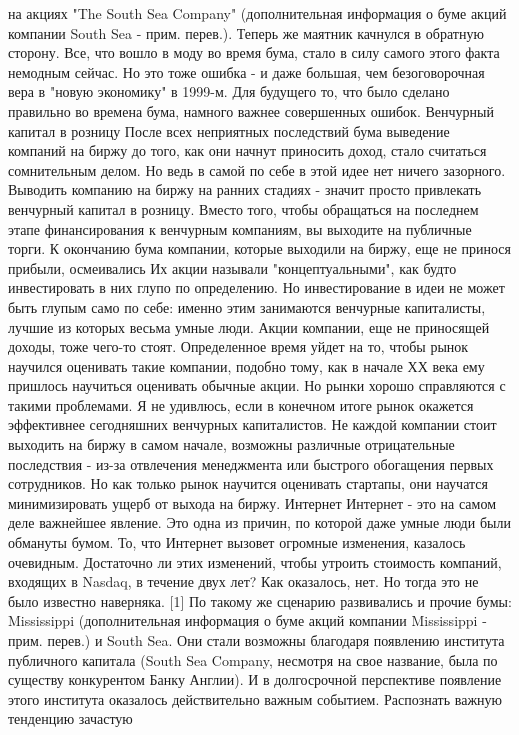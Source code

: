 \documentclass[ebook,12pt,oneside,openany]{memoir}
\begin{document}
на акциях "The South Sea Company" (дополнительная информация о буме
акций компании South Sea - прим. перев.). Теперь же маятник качнулся в
обратную сторону. Все, что вошло в моду во время бума, стало в силу
самого этого факта немодным сейчас. Но это тоже ошибка - и даже
большая, чем безоговорочная вера в "новую экономику" в 1999-м. Для
будущего то, что было сделано правильно во времена бума, намного
важнее совершенных ошибок. Венчурный капитал в розницу После всех
неприятных последствий бума выведение компаний на биржу до того, как
они начнут приносить доход, стало считаться сомнительным делом. Но
ведь в самой по себе в этой идее нет ничего зазорного. Выводить
компанию на биржу на ранних стадиях - значит просто привлекать
венчурный капитал в розницу. Вместо того, чтобы обращаться на
последнем этапе финансирования к венчурным компаниям, вы выходите на
публичные торги. К окончанию бума компании, которые выходили на биржу,
еще не принося прибыли, осмеивались Их акции называли
"концептуальными", как будто инвестировать в них глупо по определению.
Но инвестирование в идеи не может быть глупым само по себе: именно
этим занимаются венчурные капиталисты, лучшие из которых весьма умные
люди. Акции компании, еще не приносящей доходы, тоже чего-то стоят.
Определенное время уйдет на то, чтобы рынок научился оценивать такие
компании, подобно тому, как в начале ХХ века ему пришлось научиться
оценивать обычные акции. Но рынки хорошо справляются с такими
проблемами. Я не удивлюсь, если в конечном итоге рынок окажется
эффективнее сегодняшних венчурных капиталистов. Не каждой компании
стоит выходить на биржу в самом начале, возможны различные
отрицательные последствия - из-за отвлечения менеджмента или быстрого
обогащения первых сотрудников. Но как только рынок научится оценивать
стартапы, они научатся минимизировать ущерб от выхода на биржу.
Интернет Интернет - это на самом деле важнейшее явление. Это одна из
причин, по которой даже умные люди были обмануты бумом. То, что
Интернет вызовет огромные изменения, казалось очевидным. Достаточно ли
этих изменений, чтобы утроить стоимость компаний, входящих в Nasdaq, в
течение двух лет? Как оказалось, нет. Но тогда это не было известно
наверняка. [1] По такому же сценарию развивались и прочие бумы:
Mississippi (дополнительная информация о буме акций компании
Mississippi - прим. перев.) и South Sea. Они стали возможны благодаря
появлению института публичного капитала (South Sea Company, несмотря
на свое название, была по существу конкурентом Банку Англии). И в
долгосрочной перспективе появление этого института оказалось
действительно важным событием. Распознать важную тенденцию зачастую
\end{document}
